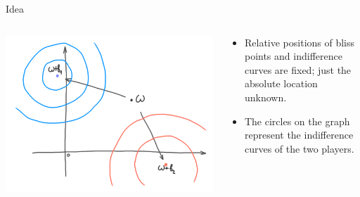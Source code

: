 \documentclass[english,10pt
,aspectratio=169
]{beamer}
\begin{document}
\begin{frame}{Idea}
	\begin{columns}
		\begin{column}{0.5\textwidth}
			\begin{center}
				\includegraphics[scale=0.65]{pics/M4/battaglini01.png}
			\end{center}
		\end{column}
		\begin{column}{0.5\textwidth}
			{\small
				\begin{itemize}
					\item Relative positions of bliss points and indifference curves are fixed; just the absolute location unknown.
					\item The circles on the graph represent the indifference curves of the two players.
				\end{itemize}
			}
		\end{column}
	\end{columns}
\end{frame}
\end{document}
